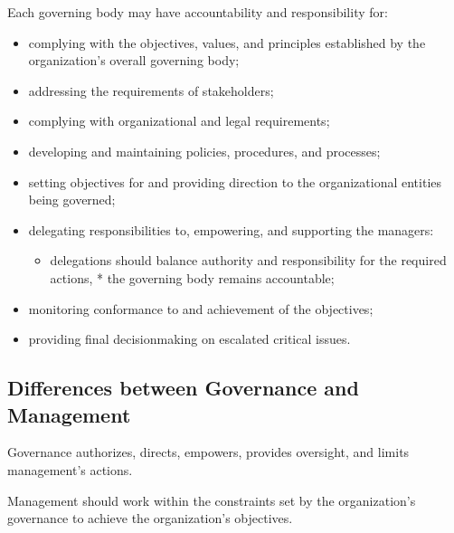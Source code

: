 \documentclass[letterpaper,10pt,english]{jupyterBook}
\begin{document}
\sphinxAtStartPar
Each governing body may have accountability and responsibility for:
\begin{itemize}
\item {} 
\sphinxAtStartPar
complying with the objectives, values, and principles established by the organization’s overall governing body;

\item {} 
\sphinxAtStartPar
addressing the requirements of stakeholders;

\item {} 
\sphinxAtStartPar
complying with organizational and legal requirements;

\item {} 
\sphinxAtStartPar
developing and maintaining policies, procedures, and processes;

\item {} 
\sphinxAtStartPar
setting objectives for and providing direction to the organizational entities being governed;

\item {} 
\sphinxAtStartPar
delegating responsibilities to, empowering, and supporting the managers:
\begin{itemize}
\item {} 
\sphinxAtStartPar
delegations should balance authority and responsibility for the required actions, * the governing body remains accountable;

\end{itemize}

\item {} 
\sphinxAtStartPar
monitoring conformance to and achievement of the objectives;

\item {} 
\sphinxAtStartPar
providing final decision\sphinxhyphen{}making on escalated critical issues.

\end{itemize}


\subsection{Differences between Governance and Management}
\label{\detokenize{PM/ppm:differences-between-governance-and-management}}
\sphinxAtStartPar
Governance authorizes, directs, empowers, provides oversight, and limits management’s actions.

\sphinxAtStartPar
Management should work within the constraints set by the organization’s governance to achieve the organization’s objectives.
\end{document}
